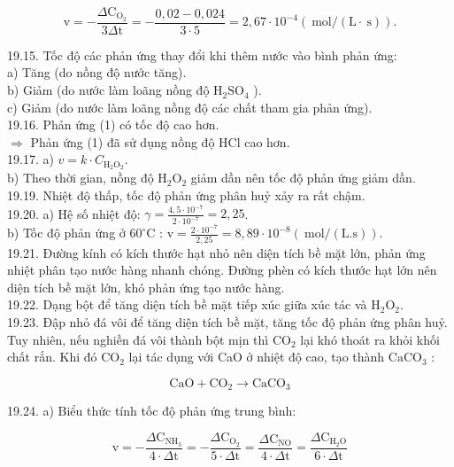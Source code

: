 \documentclass[10pt]{article}
\begin{document}
$$
\mathrm{v}=-\frac{\Delta \mathrm{C}_{\mathrm{O}_{2}}}{3 \Delta \mathrm{t}}=-\frac{0,02-0,024}{3 \cdot 5}=2,67 \cdot 10^{-4}(\mathrm{~mol} /(\mathrm{L} \cdot \mathrm{~s})) .
$$

19.15. Tốc độ các phản ứng thay đổi khi thêm nước vào bình phản ứng:\\
a) Tăng (do nồng độ nước tăng).\\
b) Giảm (do nước làm loãng nồng độ $\mathrm{H}_{2} \mathrm{SO}_{4}$ ).\\
c) Giảm (do nước làm loãng nồng độ các chất tham gia phản ứng).\\
19.16. Phản ứng (1) có tốc độ cao hơn.\\
$\Rightarrow$ Phản ứng (1) đã sử dụng nồng độ HCl cao hơn.\\
19.17. a) $v=k \cdot C_{\mathrm{H}_{2} \mathrm{O}_{2}}$.\\
b) Theo thời gian, nồng độ $\mathrm{H}_{2} \mathrm{O}_{2}$ giảm dần nên tốc độ phản ứng giảm dần.\\
19.19. Nhiệt độ thấp, tốc độ phản ứng phân huỷ xảy ra rất chậm.\\
19.20. a) Hệ số nhiệt độ: $\gamma=\frac{4,5 \cdot 10^{-7}}{2 \cdot 10^{-7}}=2,25$.\\
b) Tốc độ phản ứng ở $60^{\circ} \mathrm{C}$ : $\mathrm{v}=\frac{2 \cdot 10^{-7}}{2,25}=8,89 \cdot 10^{-8}(\mathrm{~mol} /(\mathrm{L} . \mathrm{s}))$.\\
19.21. Đường kính có kích thước hạt nhỏ nên diện tích bề mặt lớn, phản ứng nhiệt phân tạo nước hàng nhanh chóng. Đường phèn có kích thước hạt lớn nên diện tích bề mặt lớn, khó phản ứng tạo nước hàng.\\
19.22. Dạng bột để tăng diện tích bề mặt tiếp xúc giữa xúc tác và $\mathrm{H}_{2} \mathrm{O}_{2}$.\\
19.23. Đập nhỏ đá vôi để tăng diện tích bề mặt, tăng tốc độ phản ứng phân huỷ. Tuy nhiên, nếu nghiền đá vôi thành bột mịn thì $\mathrm{CO}_{2}$ lại khó thoát ra khỏi khối chất rắn. Khi đó $\mathrm{CO}_{2}$ lại tác dụng với CaO ở nhiệt độ cao, tạo thành $\mathrm{CaCO}_{3}$ :

$$
\mathrm{CaO}+\mathrm{CO}_{2} \rightarrow \mathrm{CaCO}_{3}
$$

19.24. a) Biểu thức tính tốc độ phản ứng trung bình:

$$
\mathrm{v}=-\frac{\Delta \mathrm{C}_{\mathrm{NH}_{3}}}{4 \cdot \Delta \mathrm{t}}=-\frac{\Delta \mathrm{C}_{\mathrm{O}_{2}}}{5 \cdot \Delta \mathrm{t}}=\frac{\Delta \mathrm{C}_{\mathrm{NO}}}{4 \cdot \Delta \mathrm{t}}=\frac{\Delta \mathrm{C}_{\mathrm{H}_{2} \mathrm{O}}}{6 \cdot \Delta \mathrm{t}}
$$
\end{document}
